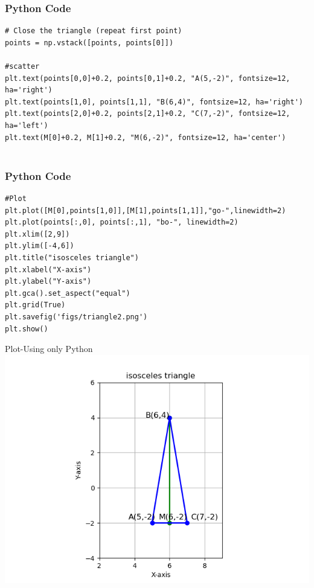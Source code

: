 \documentclass{beamer}
\begin{document}
\begin{frame}[fragile]
    \frametitle{Python Code }
    \begin{lstlisting}
# Close the triangle (repeat first point)
points = np.vstack([points, points[0]])

#scatter
plt.text(points[0,0]+0.2, points[0,1]+0.2, "A(5,-2)", fontsize=12, ha='right')
plt.text(points[1,0], points[1,1], "B(6,4)", fontsize=12, ha='right')
plt.text(points[2,0]+0.2, points[2,1]+0.2, "C(7,-2)", fontsize=12, ha='left')
plt.text(M[0]+0.2, M[1]+0.2, "M(6,-2)", fontsize=12, ha='center')


\end{lstlisting}
\end{frame}

\begin{frame}[fragile]
    \frametitle{Python Code }
    \begin{lstlisting}
#Plot
plt.plot([M[0],points[1,0]],[M[1],points[1,1]],"go-",linewidth=2)
plt.plot(points[:,0], points[:,1], "bo-", linewidth=2)
plt.xlim([2,9])
plt.ylim([-4,6])
plt.title("isosceles triangle")
plt.xlabel("X-axis")
plt.ylabel("Y-axis")
plt.gca().set_aspect("equal")
plt.grid(True)
plt.savefig('figs/triangle2.png')
plt.show()

\end{lstlisting}
\end{frame}


\begin{frame}{Plot-Using only Python}
    \centering
    \includegraphics[width=\columnwidth, height=0.8\textheight, keepaspectratio]{figs/triangle2.png}     
\end{frame}
\end{document}
